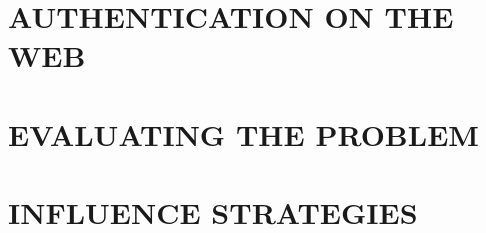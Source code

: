 \documentclass[12pt,a4paper]{book}
\begin{document}
\frontmatter
\tableofcontents

\mainmatter



\part{AUTHENTICATION ON THE WEB}


%
%










%

%


\part{EVALUATING THE PROBLEM}




\part{INFLUENCE STRATEGIES}


 
\end{document}
